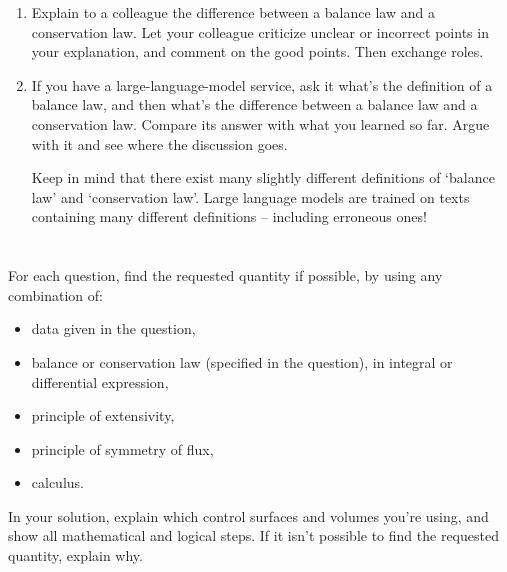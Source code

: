 \documentclass[a4paper,12pt,%
onecolumn,oneside,%
british%
]{memoir}
\renewcommand*{\|}[1][]{\nonscript\:#1\vert\nonscript\:\mathopen{}}
\begin{document}
\smallskip

\begin{enumerate}[exerc]
\item Explain to a colleague the difference between a balance law and a conservation law. Let your colleague criticize unclear or incorrect points in your explanation, and comment on the good points. Then exchange roles.
\item If you have a large-language-model service, ask it what's the definition of a balance law, and then what's the difference between a balance law and a conservation law. Compare its answer with what you learned so far. Argue with it and see where the discussion goes.\nopagebreak

  Keep in mind that there exist many slightly different definitions of \enquote*{balance law} and \enquote*{conservation law}.  Large language models are trained on texts containing many different definitions -- including erroneous ones!
\end{enumerate}


\section{}
\label{sec:calc_from_bal2}

For each question, find the requested quantity if possible, by using any combination of:
\begin{itemize}[nosep]
\item data given in the question,
\item balance or conservation law (specified in the question), in integral or differential expression,
\item principle of extensivity,
\item principle of symmetry of flux,
\item calculus.
\end{itemize}
In your solution, explain which control surfaces and volumes you're using, and show all mathematical and logical steps. If it isn't possible to find the requested quantity, explain why.
\end{document}
